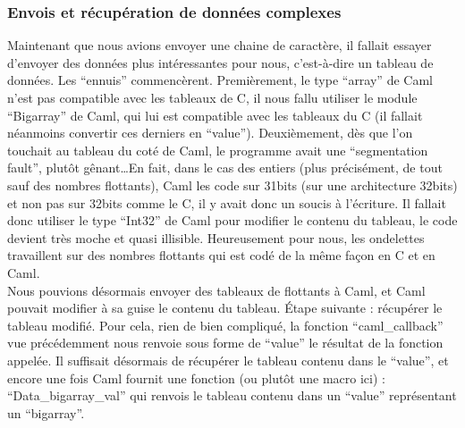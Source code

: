 \documentclass[a4paper,12pt]{article}
\begin{document}
		\subsubsection{Envois et récupération de données complexes}
Maintenant que nous avions envoyer une chaine de caractère, il fallait essayer
d'envoyer des données plus intéressantes pour nous, c'est-à-dire un tableau de
données. Les ``ennuis'' commencèrent. Premièrement, le type ``array'' de Caml
n'est pas compatible avec les tableaux de C, il nous fallu utiliser le module
``Bigarray'' de Caml, qui lui est compatible avec les tableaux du C (il fallait
néanmoins convertir ces derniers en ``value''). Deuxièmement, dès que l'on
touchait au tableau du coté de Caml, le programme avait une ``segmentation
fault'', plutôt gênant\ldots En fait, dans le cas des entiers (plus précisément,
de tout sauf des nombres flottants), Caml les code sur 31bits (sur une
architecture 32bits) et non pas sur 32bits comme le C, il y avait donc un soucis
à l'écriture. Il fallait donc utiliser le type ``Int32'' de Caml pour modifier
le contenu du tableau, le code devient très moche et quasi illisible.
Heureusement pour nous, les ondelettes travaillent sur des nombres flottants qui
est codé de la même façon en C et en Caml.\\
Nous pouvions désormais envoyer des tableaux de flottants à Caml, et Caml
pouvait modifier à sa guise le contenu du tableau. Étape suivante : récupérer le
tableau modifié. Pour cela, rien de bien compliqué, la fonction
``caml\_callback'' vue précédemment nous renvoie sous forme de ``value'' le
résultat de la fonction appelée. Il suffisait désormais de récupérer le tableau
contenu dans le ``value'', et encore une fois Caml fournit une fonction (ou
plutôt une macro ici) : ``Data\_bigarray\_val'' qui renvois le tableau contenu
dans un ``value'' représentant un ``bigarray''.
\end{document}
